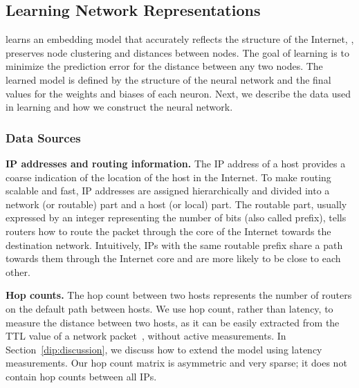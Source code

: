 \subsection{Learning Network Representations}
\label{dip:design}



\system{} learns an embedding model that accurately reflects the structure of the Internet, \ie{}, preserves node clustering and distances between nodes. The goal of learning is to minimize the prediction error for the distance between any two nodes. The learned model is defined by the structure of the neural network and the final values for the weights and biases of each neuron. Next, we describe the data used in learning and how we construct the neural network.

\subsubsection{Data Sources} 


\textbf{IP addresses and routing information.}
The IP address of a host provides a coarse indication of the location of the host in the Internet. To make routing scalable and fast, IP addresses are assigned hierarchically and divided into a  network (or routable) part and a host (or local) part. 
The routable part, usually expressed by an integer representing the number of bits (also called prefix), tells routers how to route the packet through the core of the Internet towards the destination network. Intuitively, IPs with the same routable prefix share a path towards them through the Internet core and are more likely to be close to each other.

\textbf{Hop counts.} The hop count between two hosts represents the number of routers on the default path between hosts. We use hop count, rather than latency, to measure the distance between two hosts, as it can be easily extracted from the TTL value of a network packet~\citep{hc-filter}, without active measurements. In Section~\ref{dip:discussion}, we discuss how to extend the model using latency measurements. Our hop count matrix is asymmetric and very sparse; it does not contain hop counts between all IPs. %




